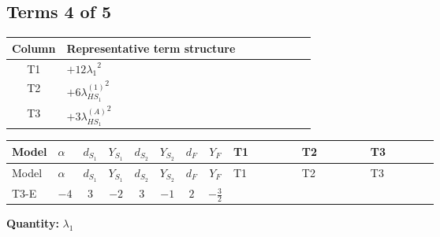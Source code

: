 \documentclass[8pt]{article}
\begin{document}
\begin{landscape}
\subsection*{Terms 4 of 5}
\begin{center}
\begin{tabular}{@{}c >{\raggedright\arraybackslash}p{0.82\linewidth}@{}}
\toprule
Column & Representative term structure \\
\midrule
T1 & \(\displaystyle +12 {\lambda_1}^2\) \\
\midrule
T2 & \(\displaystyle +6 {\lambda_{HS_1}^{(1)}}^2\) \\
\midrule
T3 & \(\displaystyle +3 {\lambda_{HS_1}^{(A)}}^2\) \\
\midrule
\bottomrule
\end{tabular}
\end{center}
\smallskip
\tiny
\begin{longtable}{@{}llcccccc >{\raggedright\arraybackslash}p{0.21\linewidth} >{\raggedright\arraybackslash}p{0.21\linewidth} >{\raggedright\arraybackslash}p{0.21\linewidth}@{}}
\toprule
Model & $\alpha$ & $d_{S_1}$ & $Y_{S_1}$ & $d_{S_2}$ & $Y_{S_2}$ & $d_F$ & $Y_F$ & T1 & T2 & T3 \\
\midrule
\endfirsthead
\toprule
Model & $\alpha$ & $d_{S_1}$ & $Y_{S_1}$ & $d_{S_2}$ & $Y_{S_2}$ & $d_F$ & $Y_F$ & T1 & T2 & T3 \\
\midrule
\endhead
T3-E & $-4$ & $3$ & $-2$ & $3$ & $-1$ & $2$ & $-\frac{3}{2}$ & \scriptsize\adjustbox{max width=\linewidth}{$\begin{gathered} +12 {\lambda_1}^2\end{gathered}$} & \scriptsize\adjustbox{max width=\linewidth}{$\begin{gathered} +6 {\lambda_{HS_1}^{(1)}}^2\end{gathered}$} & \scriptsize\adjustbox{max width=\linewidth}{$\begin{gathered} +3 {\lambda_{HS_1}^{(A)}}^2\end{gathered}$} \\
\midrule
\bottomrule
\end{longtable}
\clearpage
\noindent\textbf{Quantity: }$\lambda_1$\par\smallskip

\end{landscape}
\end{document}
